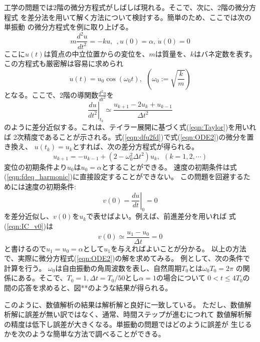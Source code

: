 \documentclass[10pt,a4j,dvipdfmx]{jarticle}
\begin{document}
工学の問題では2階の微分方程式がしばしば現れる。そこで、次に、2階の微分方程式
を差分法を用いて解く方法について検討する。簡単のため、ここでは次の単振動
の微分方程式を例に取り上げる。
\begin{equation}
	m\frac{d^2u }{dt^2}=-k u, \ \ , u(0)=\alpha,\, \dot u(0)=0
	\label{eqn:ODE2}
\end{equation}
ここに$u(t)$は質点の中立位置からの変位を、$m$は質量を、$k$はバネ定数を表す。
この方程式も厳密解は容易に求められ
\begin{equation}
	u(t)=u_0 \cos (\omega_0 t), \ \ \left( \omega_0:=\sqrt{\frac{k}{m}}\right)
	\label{eqn:exact}
\end{equation}
となる。ここで、2階の導関数$\frac{d^2u}{dt^2}$を
\begin{equation}
	\left. \frac{du}{dt^2} \right|_{t_k} \simeq 
	\frac{u_{k+1}-2u_k +u_{k-1}}{\Delta t^2}
	\label{eqn:du2fd}
\end{equation}
のように差分近似する。これは、テイラー展開に基づく式(\ref{eqn:Taylor})を用いれば
2次精度であることが示される。式(\ref{eqn:dfu2fd})で式(\ref{eqn:ODE2})の微分を置き換え、
$u(t_k)=u_k$とすれば、次の差分方程式が得られる。
\begin{equation}
	u_{k+1}=-u_{k-1}+(2-\omega_0^2\Delta t^2)u_k, \ \ (k=1,2,\cdots)
	\label{eqn:fdeq_harmonic}
\end{equation}
変位の初期条件より$u_0$は$u_0=\alpha$とすることができる。
速度の初期条件は式(\ref{eqn:fdeq_harmonic})に直接設定することができない。
この問題を回避するためには速度の初期条件:
\begin{equation}
	v(0)= \left. \frac{du}{dt} \right|_{0}=0
	\label{eqn:IC_v0}
\end{equation}
を差分近似し、$v(0)$を$u_k$で表せばよい。例えば、前進差分を用いれば
式(\ref{eqn:IC_v0})は
\begin{equation}
	v(0)\simeq \frac{u_1-u_{0}}{\Delta t}=0
	\label{eqn:}
\end{equation}
と書けるので$u_1=u_0=\alpha$として$u_1$を与えればよいことが分かる。
以上の方法で、実際に微分方程式(\ref{eqn:ODE2})の解を求めてみる。
例として、次の条件で計算を行う。
$\omega_0$は自由振動の角周波数を表し、自然周期$T_0$とは$\omega_0T_0=2\pi$
の関係にある。そこで、$T_0=1, \Delta t=T_0/50$とし$\alpha=1$の場合について
$0<t\leq 4T_0$の間の応答を求めると、図**のような結果が得られる。


このように、数値解析の結果は解析解と良好に一致している。
ただし、数値解析解に誤差が無い訳ではなく、通常、時間ステップが進むにつれて
数値解析解の精度は低下し誤差が大きくなる。単振動の問題ではどのように誤差が
生じるかを次のような簡単な方法で調べることができる。
\end{document}
